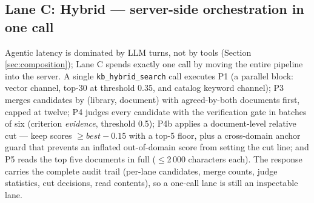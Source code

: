 \subsection{Lane C: Hybrid --- server-side orchestration in one call}
Agentic latency is dominated by LLM turns, not by tools (Section
\ref{sec:composition}); Lane C spends exactly one call by moving the entire
pipeline into the server. A single \texttt{kb\_hybrid\_search} call executes
P1 (a parallel block: vector channel, top-30 at threshold 0.35, and catalog
keyword channel); P3 merges candidates by (library, document) with
agreed-by-both
documents first, capped at twelve; P4 judges every candidate with the
verification gate in batches of six (criterion \emph{evidence}, threshold
0.5); P4b
applies a document-level relative cut --- keep scores $\geq \mathit{best} -
0.15$ with a top-5 floor, plus a cross-domain anchor guard that prevents an
inflated out-of-domain score from setting the cut line; and P5 reads the
top five documents in full ($\leq$2\,000 characters each). The response
carries the complete audit trail (per-lane candidates, merge counts, judge
statistics, cut decisions, read contents), so a one-call lane is still an
inspectable lane.

